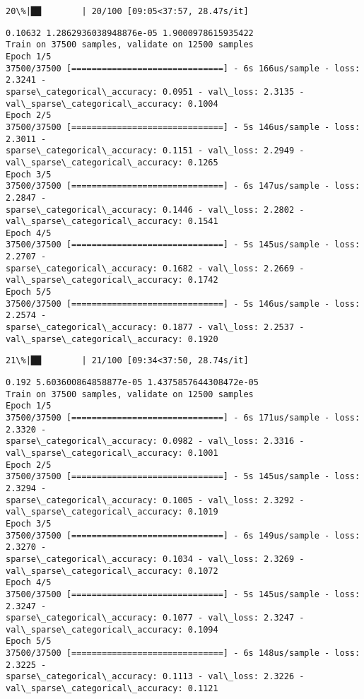 \documentclass[11pt]{article}
\begin{document}
    \begin{Verbatim}[commandchars=\\\{\}]
 20\%|██        | 20/100 [09:05<37:57, 28.47s/it]
    \end{Verbatim}

    \begin{Verbatim}[commandchars=\\\{\}]
0.10632 1.2862936038948876e-05 1.9000978615935422
Train on 37500 samples, validate on 12500 samples
Epoch 1/5
37500/37500 [==============================] - 6s 166us/sample - loss: 2.3241 -
sparse\_categorical\_accuracy: 0.0951 - val\_loss: 2.3135 -
val\_sparse\_categorical\_accuracy: 0.1004
Epoch 2/5
37500/37500 [==============================] - 5s 146us/sample - loss: 2.3011 -
sparse\_categorical\_accuracy: 0.1151 - val\_loss: 2.2949 -
val\_sparse\_categorical\_accuracy: 0.1265
Epoch 3/5
37500/37500 [==============================] - 6s 147us/sample - loss: 2.2847 -
sparse\_categorical\_accuracy: 0.1446 - val\_loss: 2.2802 -
val\_sparse\_categorical\_accuracy: 0.1541
Epoch 4/5
37500/37500 [==============================] - 5s 145us/sample - loss: 2.2707 -
sparse\_categorical\_accuracy: 0.1682 - val\_loss: 2.2669 -
val\_sparse\_categorical\_accuracy: 0.1742
Epoch 5/5
37500/37500 [==============================] - 5s 146us/sample - loss: 2.2574 -
sparse\_categorical\_accuracy: 0.1877 - val\_loss: 2.2537 -
val\_sparse\_categorical\_accuracy: 0.1920
    \end{Verbatim}

    \begin{Verbatim}[commandchars=\\\{\}]
 21\%|██        | 21/100 [09:34<37:50, 28.74s/it]
    \end{Verbatim}

    \begin{Verbatim}[commandchars=\\\{\}]
0.192 5.603600864858877e-05 1.4375857644308472e-05
Train on 37500 samples, validate on 12500 samples
Epoch 1/5
37500/37500 [==============================] - 6s 171us/sample - loss: 2.3320 -
sparse\_categorical\_accuracy: 0.0982 - val\_loss: 2.3316 -
val\_sparse\_categorical\_accuracy: 0.1001
Epoch 2/5
37500/37500 [==============================] - 5s 145us/sample - loss: 2.3294 -
sparse\_categorical\_accuracy: 0.1005 - val\_loss: 2.3292 -
val\_sparse\_categorical\_accuracy: 0.1019
Epoch 3/5
37500/37500 [==============================] - 6s 149us/sample - loss: 2.3270 -
sparse\_categorical\_accuracy: 0.1034 - val\_loss: 2.3269 -
val\_sparse\_categorical\_accuracy: 0.1072
Epoch 4/5
37500/37500 [==============================] - 5s 145us/sample - loss: 2.3247 -
sparse\_categorical\_accuracy: 0.1077 - val\_loss: 2.3247 -
val\_sparse\_categorical\_accuracy: 0.1094
Epoch 5/5
37500/37500 [==============================] - 6s 148us/sample - loss: 2.3225 -
sparse\_categorical\_accuracy: 0.1113 - val\_loss: 2.3226 -
val\_sparse\_categorical\_accuracy: 0.1121
    \end{Verbatim}
\end{document}
